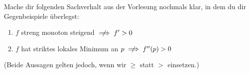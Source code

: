 \begin{exercise} %
  Mache dir folgenden Sachverhalt aus der Vorlesung nochmals klar, in dem du dir
  Gegenbeispiele überlegst:
  \begin{enumerate}[label=(\alph*)]
  \item $f$ streng monoton steigend $\centernot \implies f'>0$
  \item $f$ hat striktes lokales Minimum an $p \centernot\implies f''(p)>0$
  \end{enumerate}
  (Beide Aussagen gelten jedoch, wenn wir $\geq$ statt $>$ einsetzen.)
\end{exercise}
